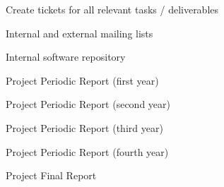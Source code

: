 \begin{workpackage}
\begin{wpdelivs}
\begin{wpdeliv}[due=1,id=tickets,dissem=PU,nature=DEC]{Create tickets for all relevant tasks / deliverables}
\end{wpdeliv}
\begin{wpdeliv}[due=1,id=mailinglists,dissem=PU,nature=DEC]{Internal and external mailing lists}
\end{wpdeliv}
\begin{wpdeliv}[due=1,id=swrepository,dissem=PU,nature=DEC]{Internal software repository}
\end{wpdeliv}
\begin{wpdeliv}[due=12,id=periodic-rep-1,dissem=PU,nature=R]{Project Periodic Report (first year)}
 \end{wpdeliv}
\begin{wpdeliv}[due=24,id=periodic-rep-2,dissem=PU,nature=R]{Project Periodic Report (second year)}
 \end{wpdeliv}
\begin{wpdeliv}[due=36,id=periodic-rep-3,dissem=PU,nature=R]{Project Periodic Report (third year)}
 \end{wpdeliv}
\begin{wpdeliv}[due=48,id=periodic-rep-4,dissem=PU,nature=R]{Project Periodic Report (fourth year)}
 \end{wpdeliv}
\begin{wpdeliv}[due=48,id=final-mgt-rep,dissem=PU,nature=R]{Project Final Report}
 \end{wpdeliv}
\end{wpdelivs}
\end{workpackage}

